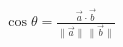\documentclass[preview]{standalone}
\begin{document}
\begin{align*}
\cos \theta = \frac{\vec a \cdot \vec b}{\lVert \vec a \rVert \, \lVert \vec b \rVert}
\end{align*}
\end{document}
